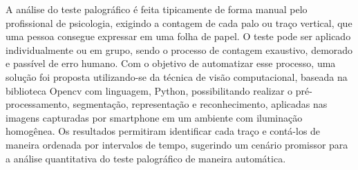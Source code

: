
\begin{resumo} 
A análise do teste palográfico é feita tipicamente de forma manual pelo profissional de psicologia, exigindo a contagem de cada palo ou traço vertical, que uma pessoa consegue expressar em uma folha de papel. O teste pode ser aplicado individualmente ou em grupo, sendo o processo de contagem exaustivo, demorado e passível de erro humano. Com o objetivo de automatizar esse processo, uma solução foi proposta utilizando-se da técnica de visão computacional, baseada na biblioteca Opencv com linguagem, Python, possibilitando realizar o pré-processamento, segmentação, representação e reconhecimento, aplicadas nas imagens capturadas por smartphone em um ambiente com iluminação homogênea. Os resultados permitiram identificar cada traço e contá-los de maneira ordenada por intervalos de tempo, sugerindo um cenário promissor para a análise quantitativa do teste palográfico de maneira automática.
\end{resumo}

